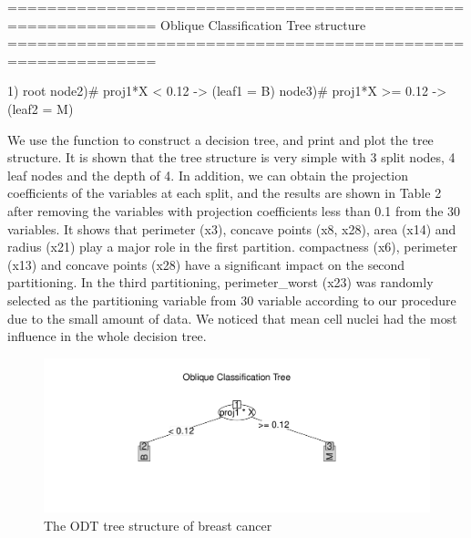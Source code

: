 \documentclass[nojss]{jss}
\newcommand{\fct}[1]{\code{#1()}}
\numberwithin{equation}{section}
\begin{document}
\begin{Schunk}
\begin{Soutput}
============================================================= 
Oblique Classification Tree structure 
=============================================================

1) root
   node2)# proj1*X < 0.12 -> (leaf1 = B)
   node3)# proj1*X >= 0.12 -> (leaf2 = M)
\end{Soutput}
\end{Schunk}
We use the function \fct{ODT} to construct a decision tree, and print and plot the tree structure. It is shown that the tree structure is very simple with 3 split nodes, 4 leaf nodes and the depth of 4. In addition, we can obtain the projection coefficients of the variables at each split, and the results are shown in Table 2 after removing the variables with projection coefficients less than 0.1 from the 30 variables. It shows that perimeter (x3), concave points (x8, x28), area (x14) and radius (x21) play a major role in the first partition. compactness (x6), perimeter (x13) and concave points (x28) have a significant impact on the second partitioning. In the third partitioning, perimeter\_worst (x23) was randomly selected as the partitioning variable from 30 variable according to our procedure due to the small amount of data. We noticed that mean cell nuclei had the most influence in the whole decision tree.
\begin{figure}[t!]
\centering
\includegraphics{ODRF-tree}
\caption{\label{fig:cancer.tree} The ODT tree structure of breast cancer}
\end{figure}
\end{document}

